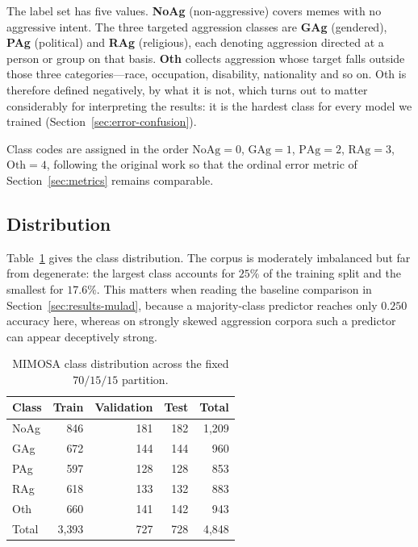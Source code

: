\documentclass[conference]{IEEEtran}
\begin{document}
The label set has five values. \textbf{NoAg} (non-aggressive) covers memes with
no aggressive intent. The three targeted aggression classes are \textbf{GAg}
(gendered), \textbf{PAg} (political) and \textbf{RAg} (religious), each denoting
aggression directed at a person or group on that basis. \textbf{Oth} collects
aggression whose target falls outside those three categories---race,
occupation, disability, nationality and so on. Oth is therefore defined
negatively, by what it is not, which turns out to matter considerably for
interpreting the results: it is the hardest class for every model we trained
(Section~\ref{sec:error-confusion}).

Class codes are assigned in the order $\mathrm{NoAg}=0$, $\mathrm{GAg}=1$,
$\mathrm{PAg}=2$, $\mathrm{RAg}=3$, $\mathrm{Oth}=4$, following the original
work so that the ordinal error metric of Section~\ref{sec:metrics} remains
comparable.

\subsection{Distribution}

Table~\ref{tab:dataset} gives the class distribution. The corpus is moderately
imbalanced but far from degenerate: the largest class accounts for $25\%$ of the
training split and the smallest for $17.6\%$. This matters when reading the
baseline comparison in Section~\ref{sec:results-mulad}, because a majority-class
predictor reaches only $0.250$ accuracy here, whereas on strongly skewed
aggression corpora such a predictor can appear deceptively strong.

\begin{table}[t]
\caption{MIMOSA class distribution across the fixed $70/15/15$ partition.}
\label{tab:dataset}
\centering
\small
\begin{tabular}{lrrrr}
\toprule
Class & Train & Validation & Test & Total \\
\midrule
NoAg  & 846 & 181 & 182 & 1{,}209 \\
GAg   & 672 & 144 & 144 & \phantom{0}960 \\
PAg   & 597 & 128 & 128 & \phantom{0}853 \\
RAg   & 618 & 133 & 132 & \phantom{0}883 \\
Oth   & 660 & 141 & 142 & \phantom{0}943 \\
\midrule
Total & 3{,}393 & 727 & 728 & 4{,}848 \\
\bottomrule
\end{tabular}
\end{table}
\end{document}
